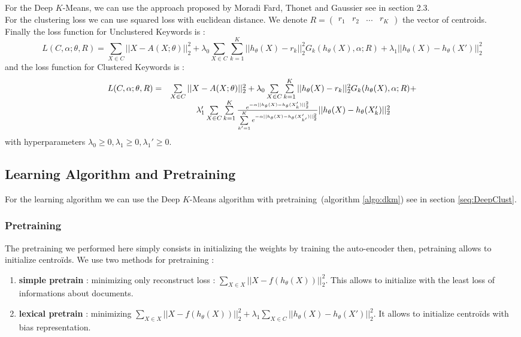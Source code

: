 For the Deep $K$-Means, we can use the approach proposed by Moradi Fard, Thonet and Gaussier 
\cite{Deap-K-Means} see in section 2.3.\\
For the clustering loss we can use squared loss with euclidean distance. We
denote $R = \begin{pmatrix} r_1 & r_2 & ... & r_K\end{pmatrix}$ the vector of
centroids.\\
Finally the loss function for Unclustered Keywords is :
\begin{equation}
L(C ,\alpha;\theta,R) = \sum\limits_{X \in C} ||X - A(X;\theta)||_2^2 + 
\lambda_0 \sum\limits_{X \in C}\sum\limits_{k=1}^K||h_\theta(X) - r_k ||_2^2 G_{k}(h_\theta(X), \alpha; R) + 
\lambda_1|| h_\theta(X) - h_\theta(X')||_2^2
\end{equation}
and the loss function for Clustered Keywords is :
\begin{equation}
\begin{array}{c c}
L(C ,\alpha;\theta,R) = & \sum\limits_{X \in C} ||X - A(X;\theta)||_2^2 + 
\lambda_0 \sum\limits_{X \in C}\sum\limits_{k=1}^K||h_\theta(X) - r_k ||_2^2 G_{k}(h_\theta(X), \alpha; R) + 
\\ & \lambda_1'\sum\limits_{X \in C} \sum\limits_{k = 1}^K \frac{e^{-\alpha|| h_\theta(X) - 
h_\theta(X'_k)||_2^2}}{\sum\limits_{k' = 1}^K e^{-\alpha|| h_\theta(X) - 
h_\theta(X'_{k'})||_2^2}}|| h_\theta(X) - h_\theta(X'_{k})||_2^2
\end{array}
\end{equation}
with hyperparameters $\lambda_0 \geq 0, \lambda_1 \geq 0, \lambda_1' \geq 0$.\\

\subsection{Learning Algorithm and Pretraining}

For the learning algorithm we can use the Deep $K$-Means algorithm with 
pretraining~(algorithm \ref{algo:dkm}) see in section \ref{seq:DeepClust}. 
 
\subsubsection{Pretraining}\label{sec:pre}
The pretraining we performed here simply consists in initializing the weights by training 
the auto-encoder then, petraining allows to initialize centroïds.
We use two methods for pretraining : 
\begin{enumerate} 
\item \textbf{simple pretrain} : minimizing only reconstruct loss :
  $\sum\limits_{X \in X} || X - f(h_\theta(X))||_2^2$. This allows to 
  initialize with the least loss of informations about documents.   
\item \textbf{lexical pretrain} : minimizing $\sum\limits_{X \in X} || X - f(h_\theta(X))||_2^2 + 
  \lambda_1 \sum\limits_{X \in C} || h_\theta(X) - h_\theta(X')||_2^2$. 
  It allows to initialize centroïds with bias representation.
\end{enumerate}


